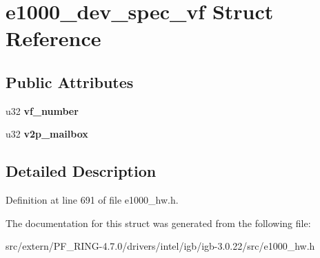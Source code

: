 \hypertarget{structe1000__dev__spec__vf}{
\section{e1000\_\-dev\_\-spec\_\-vf Struct Reference}
\label{structe1000__dev__spec__vf}
}
\subsection*{Public Attributes}
\begin{DoxyCompactItemize}
\item 
\hypertarget{structe1000__dev__spec__vf_a315e7daaeb71ed823befcdd2a4f777e4}{
u32 {\bfseries vf\_\-number}}
\label{structe1000__dev__spec__vf_a315e7daaeb71ed823befcdd2a4f777e4}

\item 
\hypertarget{structe1000__dev__spec__vf_affd391337a1053228b22fc21a62c7c06}{
u32 {\bfseries v2p\_\-mailbox}}
\label{structe1000__dev__spec__vf_affd391337a1053228b22fc21a62c7c06}

\end{DoxyCompactItemize}


\subsection{Detailed Description}


Definition at line 691 of file e1000\_\-hw.h.



The documentation for this struct was generated from the following file:\begin{DoxyCompactItemize}
\item 
src/extern/PF\_\-RING-\/4.7.0/drivers/intel/igb/igb-\/3.0.22/src/e1000\_\-hw.h\end{DoxyCompactItemize}
